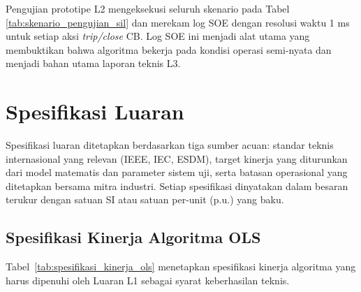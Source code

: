 Pengujian prototipe L2 mengeksekusi seluruh skenario pada Tabel \ref{tab:skenario_pengujian_sil} dan merekam log SOE dengan resolusi waktu 1 ms untuk setiap aksi \textit{trip/close} CB. Log SOE ini menjadi alat utama yang membuktikan bahwa algoritma bekerja pada kondisi operasi semi-nyata dan menjadi bahan utama laporan teknis L3.

\section{Spesifikasi Luaran}
\label{sec:Spesifikasi_Luaran}

Spesifikasi luaran ditetapkan berdasarkan tiga sumber acuan: standar teknis internasional yang relevan (IEEE, IEC, ESDM), target kinerja yang diturunkan dari model matematis dan parameter sistem uji, serta batasan operasional yang ditetapkan bersama mitra industri. Setiap spesifikasi dinyatakan dalam besaran terukur dengan satuan SI atau satuan per-unit (p.u.) yang baku.

\subsection{Spesifikasi Kinerja Algoritma OLS}
\label{subsec:Spesifikasi_Kinerja_Algoritma_OLS}

Tabel~\ref{tab:spesifikasi_kinerja_ols} menetapkan spesifikasi kinerja algoritma yang harus dipenuhi oleh Luaran L1 sebagai syarat keberhasilan teknis.

